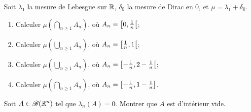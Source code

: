 \begin{td-exo}{}
    Soit \(\lambda_1\) la mesure de Lebesgue sur \(\mathbb{R}\), \(\delta_0\) la mesure de Dirac en \(0\), et \(\mu=\lambda_1+\delta_0\).
        \begin{enumerate}
            \item Calculer \(\mu(\bigcap_{n\ge 1}A_n)\), où \(A_n=\mathopen{}\left[0,\frac{1}{n}\right[\mathclose{}\);
            \item Calculer \(\mu(\bigcup_{n\ge 1}A_n)\), où \(A_n=\mathopen{}\left[\frac{1}{n},1\right[\mathclose{}\);
            \item Calculer \(\mu(\bigcup_{n\ge 1}A_n)\), où \(A_n=\mathopen{}\left[-\frac{1}{n},2-\frac{1}{n}\right[\mathclose{}\);
            \item Calculer \(\mu(\bigcap_{n\ge 1}A_n)\), où \(A_n=\mathopen{}\left[-\frac{1}{n},1-\frac{1}{n}\right]\mathclose{}\).
        \end{enumerate}
\end{td-exo}

%

\begin{td-exo}
    Soit \(A\in\mathscr{B}(\mathbb{R}^n)\) tel que \(\lambda_n(A)=0\). Montrer que \(A\) est d'intérieur vide.
\end{td-exo}


